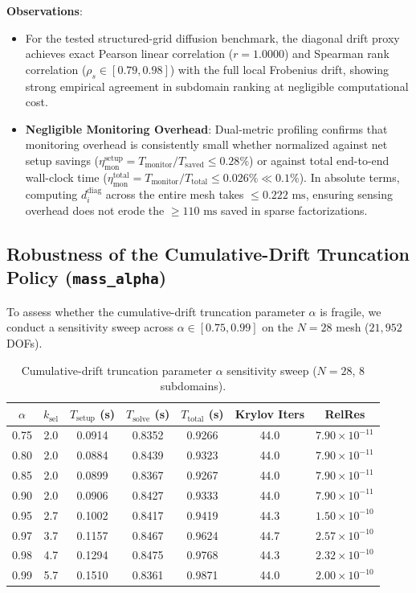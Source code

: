 \documentclass[preprint,12pt,3p]{elsarticle}
\begin{document}
\textbf{Observations}:
\begin{itemize}
    \item For the tested structured-grid diffusion benchmark, the diagonal drift proxy achieves exact Pearson linear correlation ($r = 1.0000$) and Spearman rank correlation ($\rho_s \in [0.79, 0.98]$) with the full local Frobenius drift, showing strong empirical agreement in subdomain ranking at negligible computational cost.
    \item \textbf{Negligible Monitoring Overhead}: Dual-metric profiling confirms that monitoring overhead is consistently small whether normalized against net setup savings ($\eta_{\text{mon}}^{\text{setup}} = T_{\text{monitor}} / T_{\text{saved}} \le 0.28\%$) or against total end-to-end wall-clock time ($\eta_{\text{mon}}^{\text{total}} = T_{\text{monitor}} / T_{\text{total}} \le 0.026\% \ll 0.1\%$). In absolute terms, computing $d_i^{\text{diag}}$ across the entire mesh takes $\le 0.222\text{ ms}$, ensuring sensing overhead does not erode the $\ge 110\text{ ms}$ saved in sparse factorizations.
\end{itemize}

\subsection{Robustness of the Cumulative-Drift Truncation Policy (\texttt{mass\_alpha})}
\label{subsec:res_truncation}
To assess whether the cumulative-drift truncation parameter $\alpha$ is fragile, we conduct a sensitivity sweep across $\alpha \in [0.75, 0.99]$ on the $N=28$ mesh ($21,952$ DOFs).

\begin{table}[htbp]
\centering
\small
\caption{Cumulative-drift truncation parameter $\alpha$ sensitivity sweep ($N=28$, 8 subdomains).}
\label{tab:pillar4_plateau}
\begin{tabular}{ccccccc}
\toprule
$\alpha$ & $k_{\text{sel}}$ & $T_{\text{setup}}$ (s) & $T_{\text{solve}}$ (s) & $T_{\text{total}}$ (s) & Krylov Iters & RelRes \\
\midrule
0.75 & 2.0 & 0.0914 & 0.8352 & 0.9266 & 44.0 & $7.90 \times 10^{-11}$ \\
0.80 & 2.0 & 0.0884 & 0.8439 & 0.9323 & 44.0 & $7.90 \times 10^{-11}$ \\
0.85 & 2.0 & 0.0899 & 0.8367 & 0.9267 & 44.0 & $7.90 \times 10^{-11}$ \\
0.90 & 2.0 & 0.0906 & 0.8427 & 0.9333 & 44.0 & $7.90 \times 10^{-11}$ \\
0.95 & 2.7 & 0.1002 & 0.8417 & 0.9419 & 44.3 & $1.50 \times 10^{-10}$ \\
0.97 & 3.7 & 0.1157 & 0.8467 & 0.9624 & 44.7 & $2.57 \times 10^{-10}$ \\
0.98 & 4.7 & 0.1294 & 0.8475 & 0.9768 & 44.3 & $2.32 \times 10^{-10}$ \\
0.99 & 5.7 & 0.1510 & 0.8361 & 0.9871 & 44.0 & $2.00 \times 10^{-10}$ \\
\bottomrule
\end{tabular}
\end{table}
\end{document}
